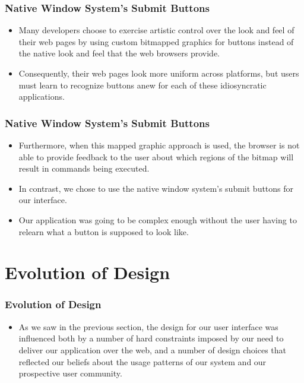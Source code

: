\documentclass{beamer}
\begin{document}
\begin{frame}
\frametitle{Native Window System's Submit Buttons}

\begin{itemize}
\item Many developers choose to exercise artistic control over the look and feel of their web pages by using custom bitmapped graphics for buttons instead of the native look and feel that the web browsers provide.
\item Consequently, their web pages look more uniform across platforms, but users must learn to recognize buttons anew for each of these idiosyncratic applications.
\end{itemize}

\end{frame}

\begin{frame}
\frametitle{Native Window System's Submit Buttons}

\begin{itemize}
\item Furthermore, when this mapped graphic approach is used, the browser is not able to provide feedback to the user about which regions of the bitmap will result in commands being executed.
\item In contrast, we chose to use the native window system's submit buttons for our interface.
\item Our application was going to be complex enough without the user having to relearn what a button is supposed to look like.
\end{itemize}

\end{frame}

\section[Evolution of Design]{Evolution of Design}


\begin{frame}
\frametitle{Evolution of Design}

\begin{itemize}
\item As we saw in the previous section, the design for our user interface was influenced both by a number of hard constraints imposed by our need to deliver our application over the web, and a number of design choices that reflected our beliefs about the usage patterns of our system and our prospective user community.
\end{itemize}

\end{frame}
\end{document}
